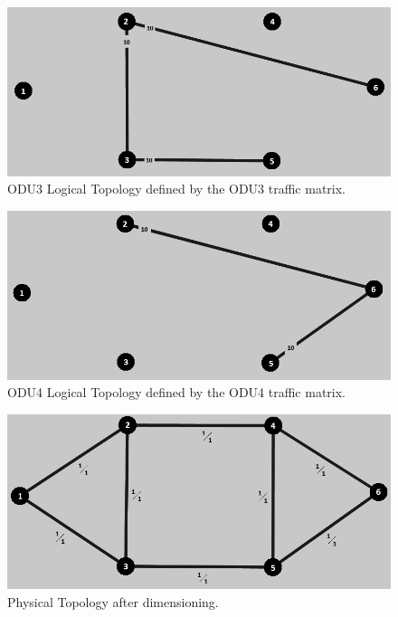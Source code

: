 \begin{figure}[H]
\centering
\includegraphics[width=13cm]{sdf/heuristic/transparent_protection/medium/logical_topology_odu3_medium}
\caption{ODU3 Logical Topology defined by the ODU3 traffic matrix.}
\label{logical_ODU3_protection_ref_medium_heuristic_transparent}
\end{figure}

\begin{figure}[H]
\centering
\includegraphics[width=13cm]{sdf/heuristic/transparent_protection/medium/logical_topology_odu4_medium}
\caption{ODU4 Logical Topology defined by the ODU4 traffic matrix.}
\label{logical_ODU4_protection_ref_medium_heuristic_transparent}
\end{figure}

\begin{figure}[H]
\centering
\includegraphics[width=13cm]{sdf/heuristic/transparent_protection/medium/physical_topology_medium}
\caption{Physical Topology after dimensioning.}
\label{physical_topology_protection_ref_medium_heuristic_transparent}
\end{figure}

